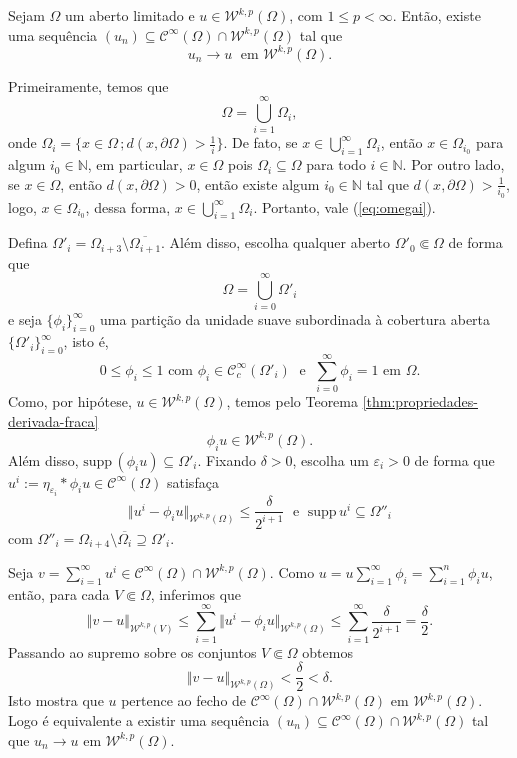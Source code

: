 \documentclass[a4paper, 11pt]{book}
\theoremstyle{definition}
\newcommand{\bN}{\mathbb{N}}
\newcommand{\cC}{\mathcal{C}}
\newcommand{\cW}{\mathcal{W}}
\newcommand{\supp}{\mathrm{supp}\,}
\begin{document}
\begin{tbox} \label{thm:aprox-2}
    Sejam $\Omega$ um aberto limitado e $u \in \cW^{k,p}(\Omega)$, com $1 \leqslant p < \infty$.
    Então, existe uma sequência $(u_n) \subseteq \cC^{\infty}(\Omega) \cap \cW^{k,p}(\Omega)$ tal que
    \[
        u_n \to u \;\text{ em } \cW^{k,p}(\Omega).
    \] 
\end{tbox}
\begin{prf}
    Primeiramente, temos que
    \begin{equation} \label{eq:omegai}
        \Omega = \bigcup_{i=1}^\infty \Omega_i,
    \end{equation}
    onde $\Omega_i = \{x \in \Omega \,; d(x, \partial\Omega) > \tfrac{1}{i}\}$. De fato,
    se $x \in \bigcup_{i=1}^\infty \Omega_i$, então $x \in \Omega_{i_0}$ para algum $i_0 \in \bN$, em particular, $x \in \Omega$ pois $\Omega_i \subseteq \Omega$ para todo $i \in \bN$.
    Por outro lado, se $x \in \Omega$, então $d(x,\partial \Omega) > 0$, então existe algum $i_0 \in \bN$ tal que $d(x, \partial \Omega) > \frac{1}{i_0}$, logo, $x \in \Omega_{i_0}$, dessa forma, $x \in \bigcup_{i=1}^\infty \Omega_i$.
    Portanto, vale (\ref{eq:omegai}). 
    
    Defina $\Omega'_i = \Omega_{i+3} \setminus \overline{\Omega_{i+1}}$.
    Além disso, escolha qualquer aberto $\Omega'_0 \Subset \Omega$ de forma que
    \[
        \Omega = \bigcup_{i=0}^\infty \Omega'_i
    \]
    e seja $\{\phi_i\}_{i=0}^\infty$ uma partição da unidade suave subordinada à cobertura aberta $\{\Omega'_i\}_{i=0}^\infty$, isto é,
    \[
       0 \leqslant \phi_i \leqslant 1 \text{ com } \phi_i \in \cC^\infty_c(\Omega'_i) \;\text{ e }\; \sum_{i=0}^\infty \phi_i = 1 \text{ em } \Omega.
    \]
    Como, por hipótese, $u \in \cW^{k,p}(\Omega)$, temos pelo Teorema \ref{thm:propriedades-derivada-fraca}
    \[
        \phi_i u \in \cW^{k,p}(\Omega).
    \]
    Além disso, $\supp(\phi_i u) \subseteq \Omega'_i$.
    Fixando $\delta > 0$, escolha um $\varepsilon_i > 0$ de forma que $u^i := \eta_{\varepsilon_i} * \phi_i u \in \cC^{\infty}(\Omega)$ satisfaça
    \[
        \Vert u^i - \phi_i u \Vert_{\cW^{k,p}(\Omega)} \leqslant \frac{\delta}{2^{i+1}} \;\text{ e }\; \supp u^i \subseteq \Omega''_i
    \]
    com $\Omega''_i = \Omega_{i+4} \setminus \overline{\Omega_{i}} \supseteq \Omega'_i$.

    Seja $v = \sum_{i=1}^\infty u^i \in \cC^{\infty}(\Omega) \cap \cW^{k,p}(\Omega)$.
    Como $u = u \sum_{i=1}^\infty \phi_i = \sum_{i=1}^n \phi_i u$, então, para cada $V \Subset \Omega$, inferimos que
    \[
        \Vert v - u \Vert_{\cW^{k,p}(V)} \leqslant \sum_{i=1}^\infty \Vert u^i - \phi_i u \Vert_{\cW^{k,p}(\Omega)} \leqslant \sum_{i=1}^\infty \frac{\delta}{2^{i+1}} = \frac{\delta}{2}.
    \]
    Passando ao supremo sobre os conjuntos $V \Subset \Omega$ obtemos
    \[
        \Vert v - u \Vert_{\cW^{k,p}(\Omega)} < \frac{\delta}{2} < \delta.
    \]
    Isto mostra que $u$ pertence ao fecho de $\cC^\infty(\Omega) \cap \cW^{k,p}(\Omega)$ em $\cW^{k,p}(\Omega)$. Logo é equivalente a existir uma sequência $(u_n) \subseteq \cC^\infty(\Omega) \cap \cW^{k,p}(\Omega)$ tal que $u_n \to u$ em $\cW^{k,p}(\Omega)$.
\end{prf}
\end{document}
